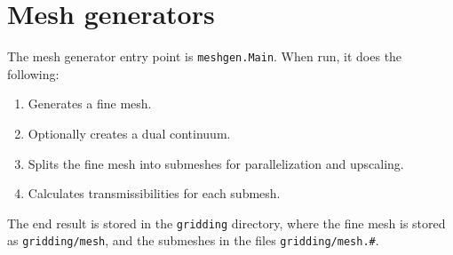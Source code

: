 \chapter{Mesh generators}
\label{chap:meshgen}

\minitoc

The mesh generator entry point is \texttt{meshgen.Main}. When run, it
does the following:
\begin{enumerate}
\item Generates a fine mesh.
\item Optionally creates a dual continuum.
\item Splits the fine mesh into submeshes for parallelization and
  upscaling.
\item Calculates transmissibilities for each submesh.
\end{enumerate}
The end result is stored in the \texttt{gridding} directory, where the
fine mesh is stored as \texttt{gridding/mesh}, and the submeshes in
the files \texttt{gridding/mesh.\#}.

